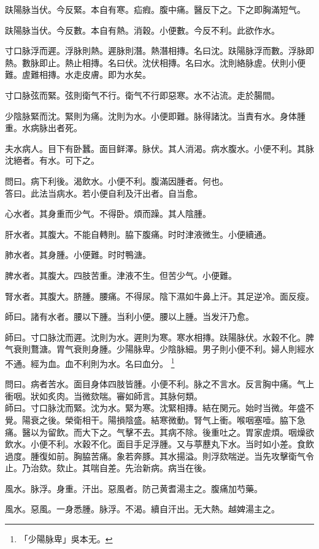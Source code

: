 趺陽脉当伏。今反緊。本自有寒。疝瘕。腹中痛。醫反下之。下之即胸滿短气。

趺陽脉当伏。今反數。本自有熱。消穀。小便數。今反不利。此欲作水。

寸口脉浮而遲。浮脉則熱。遲脉則潛。熱潛相摶。名曰沈。趺陽脉浮而數。浮脉即熱。數脉即止。熱止相摶。名曰伏。沈伏相摶。名曰水。沈則絡脉虗。伏則小便難。虗難相摶。水走皮膚。即为水矣。

寸口脉弦而緊。弦則衛气不行。{\khaaitp 衛气不行}即惡寒。水不沾流。走於腸間。

少陰脉緊而沈。緊則为痛。沈則为水。小便即難。脉得諸沈。当責有水。身体腫重。水病脉出者死。

夫水病人。目下有卧蠶。面目鲜澤。脉伏。其人消渴。病水腹水。小便不利。其脉沈絕者。有水。可下之。

問曰。病下利後。渴飲水。小便不利。腹滿因腫者。何也。\\
答曰。此法当病水。若小便自利及汗出者。自当愈。

心水者。其身重而少气。不得卧。煩而躁。其人陰腫。

肝水者。其腹大。不能自轉則。脇下腹痛。时时津液微生。小便續通。

肺水者。其身腫。小便難。时时鴨溏。

脾水者。其腹大。四肢苦重。津液不生。但苦少气。小便難。

腎水者。其腹大。脐腫。腰痛。不得尿。陰下濕如牛鼻上汗。其足逆冷。面反瘦。

師曰。諸有水者。腰以下腫。当利小便。腰以上腫。当发汗乃愈。

師曰。寸口脉沈而遲。沈則为水。遲則为寒。寒水相摶。趺陽脉伏。水穀不化。脾气衰則鶩溏。胃气衰則身腫。{\khaaitp 少陽脉卑。}少陰脉細。男子則小便不利。婦人則經水不通。經为血。血不利則为水。名曰血分。
	\footnote{「少陽脉卑」吳本无。}

問曰。病者苦水。面目身体四肢皆腫。小便不利。脉之不言水。反言胸中痛。气上衝咽。狀如炙肉。当微欬喘。審如師言。其脉何類。\\
師曰。寸口脉沈而緊。沈为水。緊为寒。沈緊相摶。結在関元。始时当微。年盛不覺。陽衰之後。榮衛相干。陽損陰盛。結寒微動。腎气上衝。喉咽塞噎。脇下急痛。醫以为留飲。而大下之。气擊不去。其病不除。後重吐之。胃家虗煩。咽燥欲飲水。小便不利。水穀不化。面目手足浮腫。又与葶藶丸下水。当时如小差。食飲過度。腫復如前。胸脇苦痛。象若奔豚。其水揚溢。則浮欬喘逆。当先攻擊衛气令止。乃治欬。欬止。其喘自差。先治新病。病当在後。

風水。脉浮。身重。汗出。惡風者。防己黄耆湯主之。腹痛加芍藥。

風水。惡風。一身悉腫。脉浮。不渴。續自汗出。无大熱。越婢湯主之。

